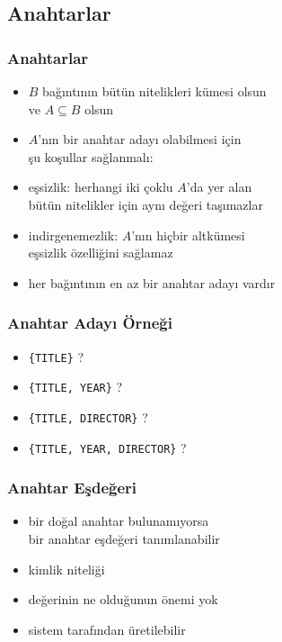 \documentclass[dvipsnames]{beamer}
\theoremstyle{plain}
\begin{document}
\subsection{Anahtarlar}

\begin{frame}
  \frametitle{Anahtarlar}

  \begin{itemize}
    \item $B$ bağıntının bütün nitelikleri kümesi olsun\\
      ve $A \subseteq B$ olsun
      
    \smallskip  

    \item $A$'nın bir anahtar adayı olabilmesi için\\
      şu koşullar sağlanmalı:

    \item \alert{eşsizlik}: herhangi iki çoklu $A$'da yer alan\\
        bütün nitelikler için aynı değeri taşımazlar

    \item \alert{indirgenemezlik}: $A$'nın hiçbir altkümesi\\
        eşsizlik özelliğini sağlamaz

    \pause
    \bigskip
    \item her bağıntının en az bir anahtar adayı vardır
  \end{itemize}
\end{frame}

\begin{frame}
  \frametitle{Anahtar Adayı Örneği}

    \begin{itemize}
      \item \texttt{\{TITLE\}} ?

      \pause
      \item \texttt{\{TITLE, YEAR\}} ?

      \pause
      \item \texttt{\{TITLE, DIRECTOR\}} ?

      \pause
      \item \texttt{\{TITLE, YEAR, DIRECTOR\}} ?
    \end{itemize}
\end{frame}

\begin{frame}
  \frametitle{Anahtar Eşdeğeri}

  \begin{itemize}
    \item bir \alert{doğal anahtar} bulunamıyorsa\\
      bir \alert{anahtar eşdeğeri} tanımlanabilir

    \pause
    \medskip
    \item kimlik niteliği
    \item değerinin ne olduğunun önemi yok
    \item sistem tarafından üretilebilir
  \end{itemize}
\end{frame}
\end{document}
